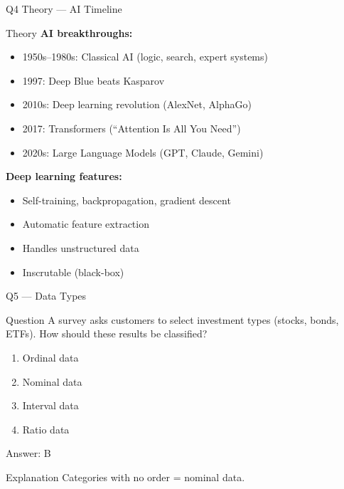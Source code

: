 \documentclass[aspectratio=169,8pt]{beamer}
\begin{document}
	\begin{frame}{Q4 Theory --- AI Timeline}
		\begin{block}{Theory}
			\textbf{AI breakthroughs:}
			\begin{itemize}
				\item 1950s--1980s: Classical AI (logic, search, expert systems)
				\item 1997: Deep Blue beats Kasparov
				\item 2010s: Deep learning revolution (AlexNet, AlphaGo)
				\item 2017: Transformers (``Attention Is All You Need'')
				\item 2020s: Large Language Models (GPT, Claude, Gemini)
			\end{itemize}
			\textbf{Deep learning features:}
			\begin{itemize}
				\item Self-training, backpropagation, gradient descent
				\item Automatic feature extraction
				\item Handles unstructured data
				\item Inscrutable (black-box)
			\end{itemize}
		\end{block}
	\end{frame}
	
	\begin{frame}{Q5 --- Data Types}
		\begin{block}{Question}
			A survey asks customers to select investment types (stocks, bonds, ETFs). How should these results be classified?
		\end{block}
		\begin{enumerate}[label=\Alph*.]
			\item Ordinal data
			\item Nominal data
			\item Interval data
			\item Ratio data
		\end{enumerate}
		\begin{exampleblock}{Answer: B}
		\end{exampleblock}
		\begin{block}{Explanation}
			Categories with no order = nominal data.
		\end{block}
	\end{frame}
	
\end{document}
